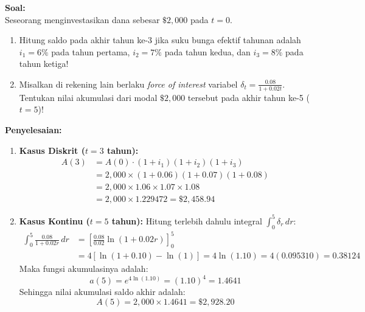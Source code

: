 \documentclass[11pt,a4paper]{article}
\begin{document}
\begin{examplebox}
\textbf{Soal:}\\
Seseorang menginvestasikan dana sebesar $\$2{,}000$ pada $t = 0$.
\begin{enumerate}[label=(\alph*)]
    \item Hitung saldo pada akhir tahun ke-3 jika suku bunga efektif tahunan adalah $i_1 = 6\%$ pada tahun pertama, $i_2 = 7\%$ pada tahun kedua, dan $i_3 = 8\%$ pada tahun ketiga!
    \item Misalkan di rekening lain berlaku \textit{force of interest} variabel $\delta_t = \frac{0.08}{1 + 0.02t}$. Tentukan nilai akumulasi dari modal $\$2{,}000$ tersebut pada akhir tahun ke-5 ($t=5$)!
\end{enumerate}

\vspace{0.5em}
\textbf{Penyelesaian:}\\
\begin{enumerate}[label=(\alph*)]
    \item \textbf{Kasus Diskrit ($t = 3$ tahun):}
    \begin{align*}
        A(3) &= A(0) \cdot (1 + i_1)(1 + i_2)(1 + i_3) \\
             &= 2{,}000 \times (1 + 0.06)(1 + 0.07)(1 + 0.08) \\
             &= 2{,}000 \times 1.06 \times 1.07 \times 1.08 \\
             &= 2{,}000 \times 1.229472 = \$2{,}458.94
    \end{align*}
    
    \item \textbf{Kasus Kontinu ($t = 5$ tahun):}
    Hitung terlebih dahulu integral $\int_0^5 \delta_r \, dr$:
    \begin{align*}
        \int_0^5 \frac{0.08}{1 + 0.02r} \, dr &= \left[ \frac{0.08}{0.02} \ln(1 + 0.02r) \right]_0^5 \\
        &= 4 \left[ \ln(1 + 0.10) - \ln(1) \right] = 4 \ln(1.10) = 4(0.095310) = 0.38124
    \end{align*}
    Maka fungsi akumulasinya adalah:
    \begin{equation*}
        a(5) = e^{4 \ln(1.10)} = (1.10)^4 = 1.4641
    \end{equation*}
    Sehingga nilai akumulasi saldo akhir adalah:
    \begin{equation*}
        A(5) = 2{,}000 \times 1.4641 = \$2{,}928.20
    \end{equation*}
\end{enumerate}
\end{examplebox}
\end{document}
